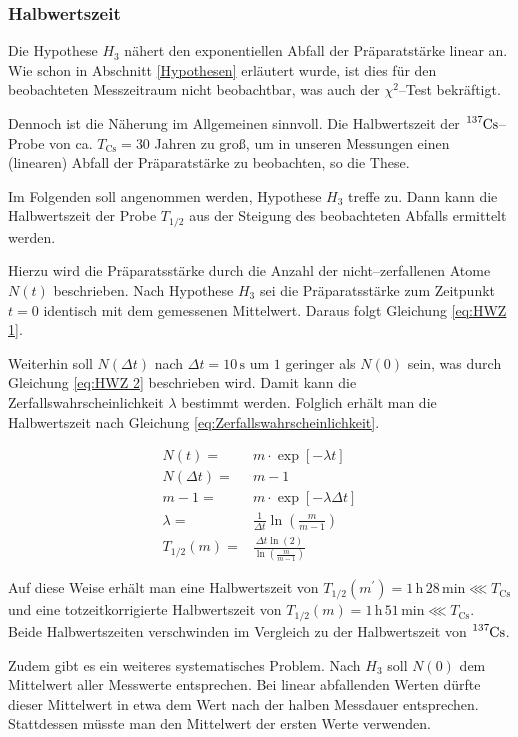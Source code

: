 \documentclass[12pt,a4paper]{scrartcl}
\numberwithin{equation}{section} %
\begin{document}
\hypertarget{totzeit}{\subsubsection{Halbwertszeit}\label{totzeit}}
Die Hypothese $H_3$ nähert den exponentiellen Abfall der Präparatstärke linear an. Wie schon in Abschnitt \ref{Hypothesen} erläutert wurde, ist dies für den beobachteten Messzeitraum nicht beobachtbar, was auch der $\chi^2$--Test bekräftigt.

Dennoch ist die Näherung im Allgemeinen sinnvoll. Die Halbwertszeit der $\ce{^{137}Cs}$--Probe von ca. $T_\mathrm{Cs}=30$ Jahren \cite{Chart of Nuclides}  zu groß, um in unseren Messungen einen (linearen) Abfall der Präparatstärke zu beobachten, so die These.

Im Folgenden soll angenommen werden, Hypothese $H_3$ treffe zu. Dann kann die Halbwertszeit der Probe $T_{1/2}$ aus der Steigung des beobachteten Abfalls ermittelt werden.

Hierzu wird die Präparatsstärke durch die Anzahl der nicht--zerfallenen Atome $N(t)$ beschrieben. Nach Hypothese $H_3$ sei die Präparatsstärke zum Zeitpunkt $t=0$ identisch mit dem gemessenen Mittelwert. Daraus folgt Gleichung \eqref{eq:HWZ 1}.

Weiterhin soll $N(\Delta t)$ nach $\Delta t=10\mathrm{\,s}$ um $1$ geringer als $N(0)$ sein, was durch Gleichung \eqref{eq:HWZ 2} beschrieben wird. Damit kann die Zerfallswahrscheinlichkeit $\lambda$ bestimmt werden. Folglich erhält man die Halbwertszeit nach Gleichung \eqref{eq:Zerfallswahrscheinlichkeit}.

\begin{align}
	N(t) =& m \cdot \exp[-\lambda t] \label{eq:HWZ 1}\\
	N(\Delta t) =& m-1 \\
	m-1 =& m \cdot \exp[-\lambda \Delta t] \label{eq:HWZ 2}\\
	\lambda =& \frac{1}{\Delta t} \ln(\frac{m}{m-1}) \\
	T_{1/2}(m) =& \frac{\Delta t \ln(2)}{\ln(\frac{m}{m-1})}
\end{align}

\noindent
Auf diese Weise erhält man eine Halbwertszeit von $T_{1/2}(m^\prime)=1\,\mathrm{h}\,28\,\mathrm{min}\lll T_\mathrm{Cs}$ und eine totzeitkorrigierte Halbwertszeit von $T_{1/2}(m)=1\,\mathrm{h}\,51\,\mathrm{min}\lll T_\mathrm{Cs}$. Beide Halbwertszeiten verschwinden im Vergleich zu der Halbwertszeit von $\ce{^{137}Cs}$.

Zudem gibt es ein weiteres systematisches Problem. Nach $H_3$ soll $N(0)$ dem Mittelwert aller Messwerte entsprechen. Bei linear abfallenden Werten dürfte dieser Mittelwert in etwa dem Wert nach der halben Messdauer entsprechen. Stattdessen müsste man den Mittelwert der ersten Werte verwenden.
\end{document}
